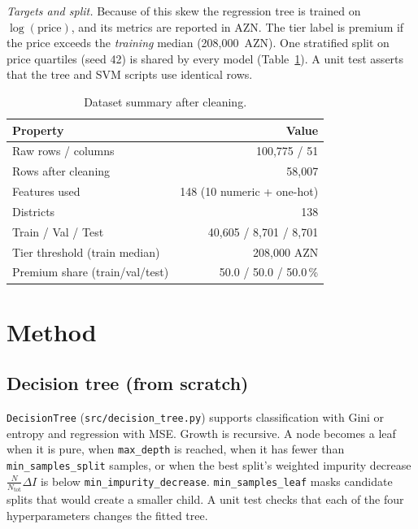 \documentclass[10pt,twocolumn,a4paper]{article}
\begin{document}
\emph{Targets and split.} Because of this skew the regression tree is
trained on $\log(\text{price})$, and its metrics are reported in AZN. The tier label
is premium if the price exceeds the \emph{training} median (208,000~AZN).
One stratified split on price quartiles (seed 42) is shared by every
model (Table~\ref{tab:data}). A unit test asserts that the tree and SVM
scripts use identical rows.

\begin{table}[t]
  \centering
  \caption{Dataset summary after cleaning.}
  \label{tab:data}
  \begin{tabular}{@{}lr@{}}
    \toprule
    Property & Value \\
    \midrule
    Raw rows / columns          & 100,775 / 51 \\
    Rows after cleaning         & 58,007 \\
    Features used               & 148 (10 numeric + one-hot) \\
    Districts                   & 138 \\
    Train / Val / Test          & 40,605 / 8,701 / 8,701 \\
    Tier threshold (train median) & 208,000 AZN \\
    Premium share (train/val/test) & 50.0 / 50.0 / 50.0\,\% \\
    \bottomrule
  \end{tabular}
\end{table}

\section{Method}
\subsection{Decision tree (from scratch)}
\texttt{DecisionTree} (\texttt{src/decision\_tree.py}) supports
classification with Gini or entropy and regression with MSE. Growth is
recursive. A node becomes a leaf when it is pure, when
\texttt{max\_depth} is reached, when it has fewer than
\texttt{min\_samples\_split} samples, or when the best split's weighted
impurity decrease $\tfrac{N}{N_{\text{tot}}}\Delta I$ is below
\texttt{min\_impurity\_decrease}. \texttt{min\_samples\_leaf} masks
candidate splits that would create a smaller child. A unit test checks
that each of the four hyperparameters changes the fitted tree.
\end{document}
